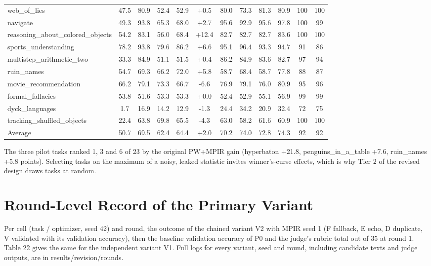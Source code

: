 \documentclass{ieeeaccess}
\begin{document}
\begin{table}[htbp]
{\begin{tabular}{lccccccccccc}
web\_\allowbreak{}of\_\allowbreak{}lies & 47.5 & 80.9 & 52.4 & 52.9 & +0.5 & 80.0 & 73.3 & 81.3 & 80.9 & 100 & 100 \\
navigate & 49.3 & 93.8 & 65.3 & 68.0 & +2.7 & 95.6 & 92.9 & 95.6 & 97.8 & 100 & 99 \\
reasoning\_\allowbreak{}about\_\allowbreak{}colored\_\allowbreak{}objects & 54.2 & 83.1 & 56.0 & 68.4 & +12.4 & 82.7 & 82.7 & 82.7 & 83.6 & 100 & 100 \\
sports\_\allowbreak{}understanding & 78.2 & 93.8 & 79.6 & 86.2 & +6.6 & 95.1 & 96.4 & 93.3 & 94.7 & 91 & 86 \\
multistep\_\allowbreak{}arithmetic\_\allowbreak{}two & 33.3 & 84.9 & 51.1 & 51.5 & +0.4 & 86.2 & 84.9 & 83.6 & 82.7 & 97 & 94 \\
ruin\_\allowbreak{}names & 54.7 & 69.3 & 66.2 & 72.0 & +5.8 & 58.7 & 68.4 & 58.7 & 77.8 & 88 & 87 \\
movie\_\allowbreak{}recommendation & 66.2 & 79.1 & 73.3 & 66.7 & -6.6 & 76.9 & 79.1 & 76.0 & 80.9 & 95 & 96 \\
formal\_\allowbreak{}fallacies & 53.8 & 51.6 & 53.3 & 53.3 & +0.0 & 52.4 & 52.9 & 55.1 & 56.9 & 99 & 99 \\
dyck\_\allowbreak{}languages & 1.7 & 16.9 & 14.2 & 12.9 & -1.3 & 24.4 & 34.2 & 20.9 & 32.4 & 72 & 75 \\
tracking\_\allowbreak{}shuffled\_\allowbreak{}objects & 22.4 & 63.8 & 69.8 & 65.5 & -4.3 & 63.0 & 58.2 & 61.6 & 60.9 & 100 & 100 \\
Average & 50.7 & 69.5 & 62.4 & 64.4 & +2.0 & 70.2 & 74.0 & 72.8 & 74.3 & 92 & 92 \\
\bottomrule
\end{tabular}
}
\end{table}

The three pilot tasks ranked 1, 3 and 6 of 23 by the original PW+MPIR gain (hyperbaton +21.8, penguins\_\allowbreak{}in\_\allowbreak{}a\_\allowbreak{}table +7.6, ruin\_\allowbreak{}names +5.8 points). Selecting tasks on the maximum of a noisy, leaked statistic invites winner's-curse effects, which is why Tier 2 of the revised design draws tasks at random.

\section{Round-Level Record of the Primary Variant}

Per cell (task / optimizer, seed 42) and round, the outcome of the chained variant V2 with MPIR seed 1 (F fallback, E echo, D duplicate, V validated with its validation accuracy), then the baseline validation accuracy of P0 and the judge's rubric total out of 35 at round 1. Table 22 gives the same for the independent variant V1. Full logs for every variant, seed and round, including candidate texts and judge outputs, are in results/revision/rounds.
\end{document}
